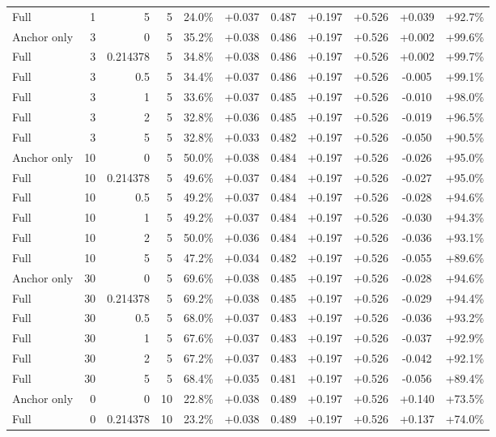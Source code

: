 \begin{table}[htbp]
\begin{tabular}{lrrrccccccc}
Full & 1 & 5 & 5 & 24.0\% & +0.037 & 0.487 & +0.197 & +0.526 & +0.039 & +92.7\% \\
Anchor only & 3 & 0 & 5 & 35.2\% & +0.038 & 0.486 & +0.197 & +0.526 & +0.002 & +99.6\% \\
Full & 3 & 0.214378 & 5 & 34.8\% & +0.038 & 0.486 & +0.197 & +0.526 & +0.002 & +99.7\% \\
Full & 3 & 0.5 & 5 & 34.4\% & +0.037 & 0.486 & +0.197 & +0.526 & -0.005 & +99.1\% \\
Full & 3 & 1 & 5 & 33.6\% & +0.037 & 0.485 & +0.197 & +0.526 & -0.010 & +98.0\% \\
Full & 3 & 2 & 5 & 32.8\% & +0.036 & 0.485 & +0.197 & +0.526 & -0.019 & +96.5\% \\
Full & 3 & 5 & 5 & 32.8\% & +0.033 & 0.482 & +0.197 & +0.526 & -0.050 & +90.5\% \\
Anchor only & 10 & 0 & 5 & 50.0\% & +0.038 & 0.484 & +0.197 & +0.526 & -0.026 & +95.0\% \\
Full & 10 & 0.214378 & 5 & 49.6\% & +0.037 & 0.484 & +0.197 & +0.526 & -0.027 & +95.0\% \\
Full & 10 & 0.5 & 5 & 49.2\% & +0.037 & 0.484 & +0.197 & +0.526 & -0.028 & +94.6\% \\
Full & 10 & 1 & 5 & 49.2\% & +0.037 & 0.484 & +0.197 & +0.526 & -0.030 & +94.3\% \\
Full & 10 & 2 & 5 & 50.0\% & +0.036 & 0.484 & +0.197 & +0.526 & -0.036 & +93.1\% \\
Full & 10 & 5 & 5 & 47.2\% & +0.034 & 0.482 & +0.197 & +0.526 & -0.055 & +89.6\% \\
Anchor only & 30 & 0 & 5 & 69.6\% & +0.038 & 0.485 & +0.197 & +0.526 & -0.028 & +94.6\% \\
Full & 30 & 0.214378 & 5 & 69.2\% & +0.038 & 0.485 & +0.197 & +0.526 & -0.029 & +94.4\% \\
Full & 30 & 0.5 & 5 & 68.0\% & +0.037 & 0.483 & +0.197 & +0.526 & -0.036 & +93.2\% \\
Full & 30 & 1 & 5 & 67.6\% & +0.037 & 0.483 & +0.197 & +0.526 & -0.037 & +92.9\% \\
Full & 30 & 2 & 5 & 67.2\% & +0.037 & 0.483 & +0.197 & +0.526 & -0.042 & +92.1\% \\
Full & 30 & 5 & 5 & 68.4\% & +0.035 & 0.481 & +0.197 & +0.526 & -0.056 & +89.4\% \\
Anchor only & 0 & 0 & 10 & 22.8\% & +0.038 & 0.489 & +0.197 & +0.526 & +0.140 & +73.5\% \\
Full & 0 & 0.214378 & 10 & 23.2\% & +0.038 & 0.489 & +0.197 & +0.526 & +0.137 & +74.0\% \\

\end{tabular}
\end{table}
